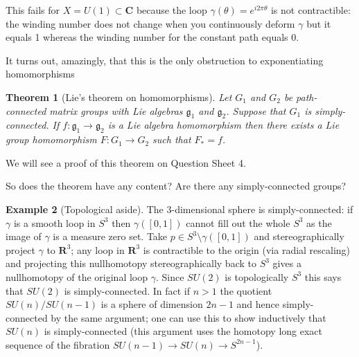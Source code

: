 \documentclass[12pt]{article}
\newcommand{\CC}{\mathbf{C}}
\newcommand{\RR}{\mathbf{R}}
\newtheorem{thm}{Theorem}[section]
\theoremstyle{definition}
\newtheorem{exm}[thm]{Example}
\theoremstyle{check}
\theoremstyle{remark}
\theoremstyle{TheoremNum}
\begin{document}
This fails for $X=U(1)\subset\CC$ because the loop $\gamma(\theta)=e^{i2\pi\theta}$ is not contractible: the winding number does not change when you continuously deform $\gamma$ but it equals 1 whereas the winding number for the constant path equals 0.

It turns out, amazingly, that this is the only obstruction to exponentiating homomorphisms

\begin{thm}[Lie's theorem on homomorphisms]
Let $G_1$ and $G_2$ be path-connected matrix groups with Lie algebras $\mathfrak{g}_1$ and $\mathfrak{g}_2$. Suppose that $G_1$ is simply-connected. If $f\colon\mathfrak{g}_1\to\mathfrak{g}_2$ is a Lie algebra homomorphism then there exists a Lie group homomorphism $F\colon G_1\to G_2$ such that $F_*=f$.
\end{thm}

We will see a proof of this theorem on Question Sheet 4.

So does the theorem have any content? Are there any simply-connected groups?

\begin{exm}[Topological aside]
The 3-dimensional sphere is simply-connected: if $\gamma$ is a smooth loop in $S^3$ then $\gamma([0,1])$ cannot fill out the whole $S^3$ as the image of $\gamma$ is a measure zero set. Take $p\in S^3\setminus\gamma([0,1])$ and stereographically project $\gamma$ to $\RR^3$; any loop in $\RR^3$ is contractible to the origin (via radial rescaling) and projecting this nullhomotopy stereographically back to $S^3$ gives a nullhomotopy of the original loop $\gamma$. Since $SU(2)$ is topologically $S^3$ this says that $SU(2)$ is simply-connected. In fact if $n>1$ the quotient $SU(n)/SU(n-1)$ is a sphere of dimension $2n-1$ and hence simply-connected by the same argument; one can use this to show inductively that $SU(n)$ is simply-connected (this argument uses the homotopy long exact sequence of the fibration $SU(n-1)\to SU(n)\to S^{2n-1}$).
\end{exm}
\end{document}
